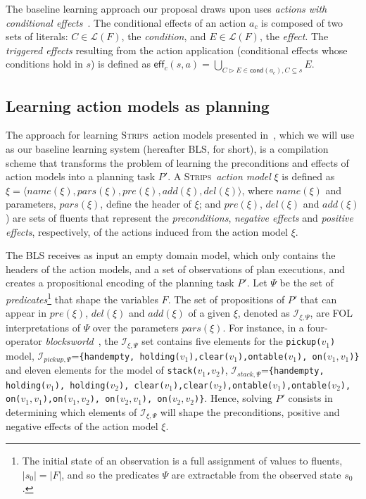 \documentclass{article}
\newcommand{\tup}[1]{{\langle #1 \rangle}}
\newcommand{\eff}{\mathsf{eff}}     %
\newcommand{\cond}{\mathsf{cond}}   %
\newcommand{\strips}{\textsc{Strips}}
\begin{document}
The baseline learning approach our proposal draws upon uses {\em actions with conditional effects}~\cite{aineto2018learning}. The conditional effects of an action $a_c$ is composed of two sets of literals: $C\in\mathcal{L}(F)$, the {\em condition}, and $E\in\mathcal{L}(F)$, the {\em effect}. The {\em triggered effects} resulting from the action application (conditional effects whose conditions hold in $s$) is defined as $\eff_c(s,a)=\bigcup_{C\rhd E\in\cond(a_c),C\subseteq s} E$.


\subsection{Learning action models as planning}
\label{FAMA}

The approach for learning \strips\ action models presented in~\cite{aineto2018learning}, which we will use as our baseline learning system (hereafter BLS, for short), is a compilation scheme that transforms the problem of learning the preconditions and effects of action models into a planning task $P'$. A \strips\ \emph{action model} $\xi$ is defined as $\xi=\tup{name(\xi),pars(\xi),pre(\xi),add(\xi),del(\xi)}$, where $name(\xi)$ and parameters, $pars(\xi)$, define the header of $\xi$; and $pre(\xi)$, $del(\xi)$ and $add(\xi)$) are sets of fluents that represent the {\em preconditions}, {\em negative effects} and {\em positive effects}, respectively, of the actions induced from the action model $\xi$.

The BLS receives as input an empty domain model, which only contains the headers of the action models, and a set of observations of plan executions, and creates a propositional encoding of the planning task $P'$. Let $\Psi$ be the set of {\em predicates}\footnote{The initial state of an observation is a full assignment of values to fluents, $|s_0|=|F|$, and so the predicates $\Psi$ are extractable from the observed state $s_0$.} that shape the variables $F$. The set of propositions of $P'$ that can appear in $pre(\xi)$, $del(\xi)$ and $add(\xi)$ of a given $\xi$, denoted as ${\mathcal I}_{\xi,\Psi}$, are FOL interpretations of $\Psi$ over the parameters $pars(\xi)$. For instance, in a four-operator {\em blocksworld}~\cite{slaney2001blocks}, the ${\mathcal I}_{\xi,\Psi}$ set contains five elements for the {\small \tt pickup($v_1$)} model, ${\mathcal I}_{pickup,\Psi}$={\small\tt\{handempty, holding($v_1$),clear($v_1$),ontable($v_1$), on($v_1,v_1$)\}} and eleven elements for the model of {\small \tt stack($v_1$,$v_2$)}, ${\mathcal I}_{stack,\Psi}$={\small\tt\{handempty, holding($v_1$), holding($v_2$), clear($v_1$),clear($v_2$),ontable($v_1$),ontable($v_2$), \\
on($v_1,v_1$),on($v_1,v_2$), on($v_2,v_1$), on($v_2,v_2$)\}}. Hence, solving $P'$ consists in determining which elements of ${\mathcal I}_{\xi,\Psi}$ will shape the preconditions, positive and negative effects of the action model $\xi$.
\end{document}

